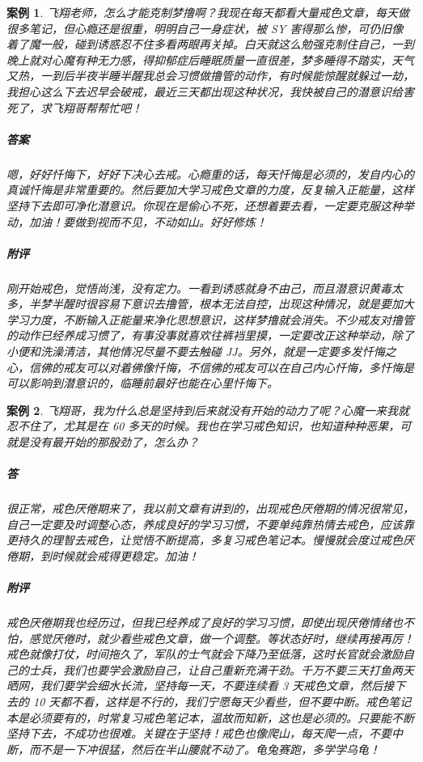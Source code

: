 \documentclass{ctexart}
\newtheorem{case}{案例}
\begin{document}
\begin{case}
    飞翔老师，怎么才能克制梦撸啊？我现在每天都看大量戒色文章，每天做很多笔记，但心瘾还是很重，明明自己一身症状，被 SY 害得那么惨，可仍旧像着了魔一般，碰到诱惑忍不住多看两眼再关掉。白天就这么勉强克制住自己，一到晚上就对心魔有种无力感，得抑郁症后睡眠质量一直很差，梦多睡得不踏实，天气又热，一到后半夜半睡半醒我总会习惯做撸管的动作，有时候能惊醒就躲过一劫，我担心这么下去迟早会破戒，最近三天都出现这种状况，我快被自己的潜意识给害死了，求飞翔哥帮帮忙吧！
    \subparagraph{答案} 嗯，好好忏悔下，好好下决心去戒。心瘾重的话，每天忏悔是必须的，发自内心的真诚忏悔是非常重要的。然后要加大学习戒色文章的力度，反复输入正能量，这样坚持下去即可净化潜意识。你现在是偷心不死，还想着要去看，一定要克服这种举动，加油！要做到视而不见，不动如山。好好修炼！
    \subparagraph{附评} 刚开始戒色，觉悟尚浅，没有定力。一看到诱惑就身不由己，而且潜意识黄毒太多，半梦半醒时很容易下意识去撸管，根本无法自控，出现这种情况，就是要加大学习力度，不断输入正能量来净化思想意识，这样梦撸就会消失。不少戒友对撸管的动作已经养成习惯了，有事没事就喜欢往裤裆里摸，一定要改正这种举动，除了小便和洗澡清洁，其他情况尽量不要去触碰 JJ。另外，就是一定要多发忏悔之心，信佛的戒友可以对着佛像忏悔，不信佛的戒友可以在自己内心忏悔，多忏悔是可以影响到潜意识的，临睡前最好也能在心里忏悔下。
\end{case}

\begin{case}
    飞翔哥，我为什么总是坚持到后来就没有开始的动力了呢？心魔一来我就忍不住了，尤其是在 60 多天的时候。我也在学习戒色知识，也知道种种恶果，可就是没有最开始的那股劲了，怎么办？
    \subparagraph{答} 很正常，戒色厌倦期来了，我以前文章有讲到的，出现戒色厌倦期的情况很常见，自己一定要及时调整心态，养成良好的学习习惯，不要单纯靠热情去戒色，应该靠更持久的理智去戒色，让觉悟不断提高，多复习戒色笔记本。慢慢就会度过戒色厌倦期，到时候就会戒得更稳定。加油！
    \subparagraph{附评} 戒色厌倦期我也经历过，但我已经养成了良好的学习习惯，即使出现厌倦情绪也不怕，感觉厌倦时，就少看些戒色文章，做一个调整。等状态好时，继续再接再厉！戒色就像打仗，时间拖久了，军队的士气就会下降乃至低落，这时长官就会激励自己的士兵，我们也要学会激励自己，让自己重新充满干劲。千万不要三天打鱼两天晒网，我们要学会细水长流，坚持每一天，不要连续看 3 天戒色文章，然后接下去的 10 天都不看，这样是不行的，我们宁愿每天少看些，但不要中断。戒色笔记本是必须要有的，时常复习戒色笔记本，温故而知新，这也是必须的。只要能不断坚持下去，不成功也很难。关键在于坚持！戒色也像爬山，每天爬一点，不要中断，而不是一下冲很猛，然后在半山腰就不动了。龟兔赛跑，多学学乌龟！
\end{case}
\end{document}
